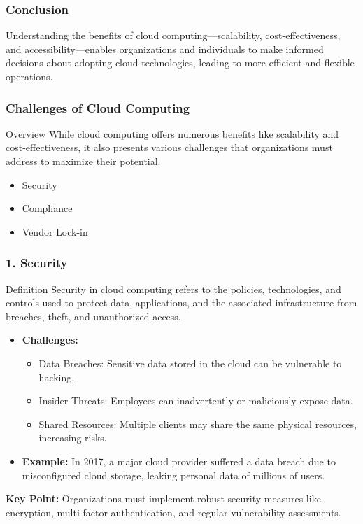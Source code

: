 \documentclass[aspectratio=169]{beamer}
\begin{document}
\begin{frame}[fragile]
  \frametitle{Conclusion}
  Understanding the benefits of cloud computing—scalability, cost-effectiveness, and accessibility—enables organizations and individuals to make informed decisions about adopting cloud technologies, leading to more efficient and flexible operations.
\end{frame}

\begin{frame}[fragile]
    \frametitle{Challenges of Cloud Computing}
    \begin{block}{Overview}
        While cloud computing offers numerous benefits like scalability and cost-effectiveness, it also presents various challenges that organizations must address to maximize their potential. 
    \end{block}
    \begin{itemize}
        \item Security
        \item Compliance
        \item Vendor Lock-in
    \end{itemize}
\end{frame}

\begin{frame}[fragile]
    \frametitle{1. Security}
    \begin{block}{Definition}
        Security in cloud computing refers to the policies, technologies, and controls used to protect data, applications, and the associated infrastructure from breaches, theft, and unauthorized access.
    \end{block}
    \begin{itemize}
        \item \textbf{Challenges:}
        \begin{itemize}
            \item Data Breaches: Sensitive data stored in the cloud can be vulnerable to hacking.
            \item Insider Threats: Employees can inadvertently or maliciously expose data.
            \item Shared Resources: Multiple clients may share the same physical resources, increasing risks.
        \end{itemize}
        \item \textbf{Example:} In 2017, a major cloud provider suffered a data breach due to misconfigured cloud storage, leaking personal data of millions of users.
    \end{itemize}
    \textbf{Key Point:} Organizations must implement robust security measures like encryption, multi-factor authentication, and regular vulnerability assessments.
\end{frame}
\end{document}
